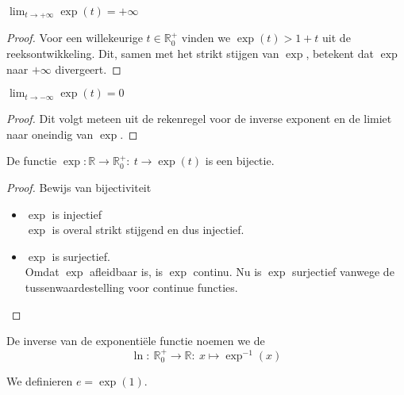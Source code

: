 \documentclass[main.tex]{subfiles}
\begin{document}
\begin{bpr}
  $\lim_{t \rightarrow +\infty}\exp(t) = +\infty$

  \begin{proof}
    Voor een willekeurige $t\in \mathbb{R}_{0}^{+}$ vinden we $\exp(t) > 1 + t$ uit de reeksontwikkeling.
    Dit, samen met het strikt stijgen van $\exp$, betekent dat $\exp$ naar $+\infty$ divergeert.
  \end{proof}
\end{bpr}

\begin{bpr}
  $\lim_{t \rightarrow -\infty}\exp(t) = 0$

  \begin{proof}
    Dit volgt meteen uit de rekenregel voor de inverse exponent en de limiet naar oneindig van $\exp$.
  \end{proof}
\end{bpr}

\begin{bpr}
  De functie $\exp: \mathbb{R} \rightarrow \mathbb{R}_{0}^{+}:\ t \rightarrow \exp(t)$ is een bijectie.

  \begin{proof}
    Bewijs van bijectiviteit
    \begin{itemize}
    \item $\exp$ is injectief\\
      $\exp$ is overal strikt stijgend en dus injectief.
    \item $\exp$ is surjectief.\\
      Omdat $\exp$ afleidbaar is, is $\exp$ continu.
      Nu is $\exp$ surjectief vanwege de tussenwaardestelling voor continue functies.
    \end{itemize}
  \end{proof}
\end{bpr}

\begin{de}
  De inverse van de exponenti\"ele functie noemen we de 
  \[ \ln:\ \mathbb{R}_{0}^{+}\rightarrow \mathbb{R}:\ x \mapsto \exp^{-1}(x) \]
\end{de}


\begin{de}
  We definieren $e = \exp(1)$.
\end{de}
\end{document}
